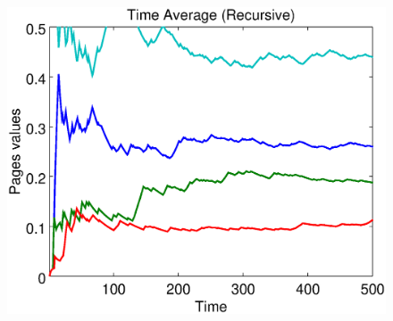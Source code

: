 \documentclass{beamer}
\begin{document}
\begin{frame}
\begin{figure}[!htb]
	\hspace{0.1cm}
	\includegraphics[scale=0.25]{figures/500/timerecursive.eps}
	\label{}
\end{figure}	
	
\end{frame}
\end{document}
